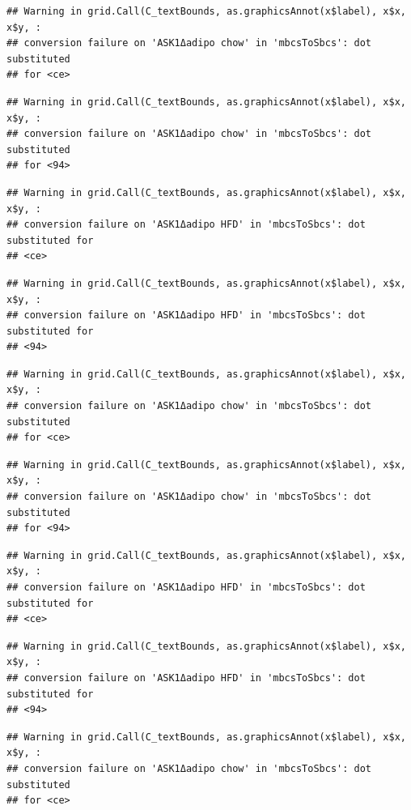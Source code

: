 \documentclass[]{book}
\begin{document}
\begin{verbatim}
## Warning in grid.Call(C_textBounds, as.graphicsAnnot(x$label), x$x, x$y, :
## conversion failure on 'ASK1Δadipo chow' in 'mbcsToSbcs': dot substituted
## for <ce>
\end{verbatim}

\begin{verbatim}
## Warning in grid.Call(C_textBounds, as.graphicsAnnot(x$label), x$x, x$y, :
## conversion failure on 'ASK1Δadipo chow' in 'mbcsToSbcs': dot substituted
## for <94>
\end{verbatim}

\begin{verbatim}
## Warning in grid.Call(C_textBounds, as.graphicsAnnot(x$label), x$x, x$y, :
## conversion failure on 'ASK1Δadipo HFD' in 'mbcsToSbcs': dot substituted for
## <ce>
\end{verbatim}

\begin{verbatim}
## Warning in grid.Call(C_textBounds, as.graphicsAnnot(x$label), x$x, x$y, :
## conversion failure on 'ASK1Δadipo HFD' in 'mbcsToSbcs': dot substituted for
## <94>
\end{verbatim}

\begin{verbatim}
## Warning in grid.Call(C_textBounds, as.graphicsAnnot(x$label), x$x, x$y, :
## conversion failure on 'ASK1Δadipo chow' in 'mbcsToSbcs': dot substituted
## for <ce>
\end{verbatim}

\begin{verbatim}
## Warning in grid.Call(C_textBounds, as.graphicsAnnot(x$label), x$x, x$y, :
## conversion failure on 'ASK1Δadipo chow' in 'mbcsToSbcs': dot substituted
## for <94>
\end{verbatim}

\begin{verbatim}
## Warning in grid.Call(C_textBounds, as.graphicsAnnot(x$label), x$x, x$y, :
## conversion failure on 'ASK1Δadipo HFD' in 'mbcsToSbcs': dot substituted for
## <ce>
\end{verbatim}

\begin{verbatim}
## Warning in grid.Call(C_textBounds, as.graphicsAnnot(x$label), x$x, x$y, :
## conversion failure on 'ASK1Δadipo HFD' in 'mbcsToSbcs': dot substituted for
## <94>
\end{verbatim}

\begin{verbatim}
## Warning in grid.Call(C_textBounds, as.graphicsAnnot(x$label), x$x, x$y, :
## conversion failure on 'ASK1Δadipo chow' in 'mbcsToSbcs': dot substituted
## for <ce>
\end{verbatim}
\end{document}
